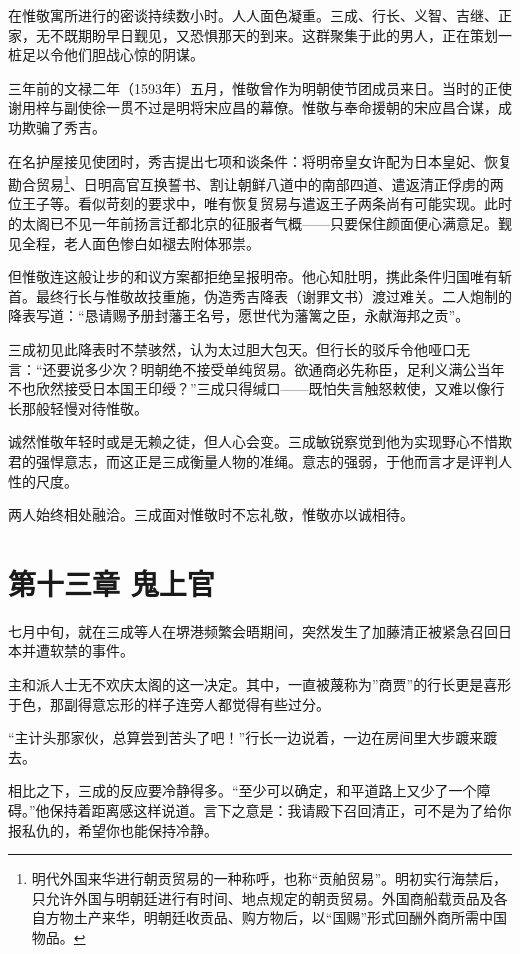 \documentclass[
]{article}
\begin{document}
在惟敬寓所进行的密谈持续数小时。人人面色凝重。三成、行长、义智、吉继、正家，无不既期盼早日觐见，又恐惧那天的到来。这群聚集于此的男人，正在策划一桩足以令他们胆战心惊的阴谋。

三年前的文禄二年（1593年）五月，惟敬曾作为明朝使节团成员来日。当时的正使谢用梓与副使徐一贯不过是明将宋应昌的幕僚。惟敬与奉命援朝的宋应昌合谋，成功欺骗了秀吉。

在名护屋接见使团时，秀吉提出七项和谈条件：将明帝皇女许配为日本皇妃、恢复勘合贸易\footnote{明代外国来华进行朝贡贸易的一种称呼，也称``贡舶贸易''。明初实行海禁后，只允许外国与明朝廷进行有时间、地点规定的朝贡贸易。外国商船载贡品及各自方物土产来华，明朝廷收贡品、购方物后，以``国赐''形式回酬外商所需中国物品。}、日明高官互换誓书、割让朝鲜八道中的南部四道、遣返清正俘虏的两位王子等。看似苛刻的要求中，唯有恢复贸易与遣返王子两条尚有可能实现。此时的太阁已不见一年前扬言迁都北京的征服者气概------只要保住颜面便心满意足。觐见全程，老人面色惨白如褪去附体邪祟。

但惟敬连这般让步的和议方案都拒绝呈报明帝。他心知肚明，携此条件归国唯有斩首。最终行长与惟敬故技重施，伪造秀吉降表（谢罪文书）渡过难关。二人炮制的降表写道：``恳请赐予册封藩王名号，愿世代为藩篱之臣，永献海邦之贡''。

三成初见此降表时不禁骇然，认为太过胆大包天。但行长的驳斥令他哑口无言：``还要说多少次？明朝绝不接受单纯贸易。欲通商必先称臣，足利义满公当年不也欣然接受日本国王印绶？''三成只得缄口------既怕失言触怒敕使，又难以像行长那般轻慢对待惟敬。

诚然惟敬年轻时或是无赖之徒，但人心会变。三成敏锐察觉到他为实现野心不惜欺君的强悍意志，而这正是三成衡量人物的准绳。意志的强弱，于他而言才是评判人性的尺度。

两人始终相处融洽。三成面对惟敬时不忘礼敬，惟敬亦以诚相待。

\section*{第十三章 鬼上官}\label{ux7b2cux5341ux4e09ux7ae0-ux9b3cux4e0aux5b98}

七月中旬，就在三成等人在堺港频繁会晤期间，突然发生了加藤清正被紧急召回日本并遭软禁的事件。

主和派人士无不欢庆太阁的这一决定。其中，一直被蔑称为''商贾''的行长更是喜形于色，那副得意忘形的样子连旁人都觉得有些过分。

``主计头那家伙，总算尝到苦头了吧！''行长一边说着，一边在房间里大步踱来踱去。

相比之下，三成的反应要冷静得多。``至少可以确定，和平道路上又少了一个障碍。''他保持着距离感这样说道。言下之意是：我请殿下召回清正，可不是为了给你报私仇的，希望你也能保持冷静。
\end{document}
